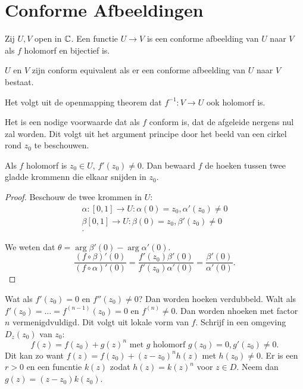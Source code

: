 
\chapter{Conforme Afbeeldingen} \label{chap:conforme_afbeeldingen}

\begin{definitie}
Zij $U, V$ open in $\mathbb{C}$. 
	Een functie $U\to V$ is een conforme afbeelding van  $U$ naar $V$ als $f$ holomorf en bijectief is. 

	$U$ en $V$ zijn conform equivalent als er een conforme afbeelding van $U$ naar $V $ bestaat. 
\end{definitie}

\begin{opmerking}
	Het volgt uit de openmapping theorem dat $f^{-1}:V \to U$ ook holomorf is.
\end{opmerking}

Het is een nodige voorwaarde dat als $f$ conform is, dat de afgeleide nergens nul zal worden. 
Dit volgt uit het argument principe door het beeld van een cirkel rond $z_0$ te beschouwen.  

\begin{propositie}
	Als $f$ holomorf is $z_0 \in U$, $f'(z_0) \ne 0$. Dan bewaard $f$ de hoeken tussen twee gladde krommenn die elkaar snijden in $z_0$. 
\end{propositie}
\begin{proof}
	Beschouw de twee krommen in $U$:  
	\begin{align*}
		\alpha: [0,1] \to U: \alpha(0) = z_0, \alpha'(z_0) \ne 0\\
		\beta[0,1] \to U: \beta(0) = z_0, \beta'(z_0) \ne 0\\
	.\end{align*}

	We weten dat $\theta = \arg \beta'(0) - \arg \alpha'(0)$. 
	\[
		\frac{(f\circ \beta)'\left( 0 \right) }{(f \circ \alpha)'(0)} = \frac{f'(z_0)\beta'(0)}{f'(z_0) \alpha'(0)} = \frac{\beta'(0)}{\alpha'(0)}
	.\]  
\end{proof}

Wat als $f'(z_0) = 0$ en $f''(z_0) \ne 0$? Dan worden hoeken verdubbeld. 
Walt als $f'(z_0) = \ldots = f^{(n-1)}(z_0) = 0$ en $f^{(n)} \ne 0$. Dan worden nhoeken met factor $n$ vermenigdvuldigd. 
Dit volgt uit lokale vorm van $f$. Schrijf  in een omgeving $D_z(z_0)$ van $z_0$: \[
	f(z) = f(z_0) + g(z)^{n} \text{ met } g \text{ holomorf } g(z_0) = 0, g'(z_0) \ne 0  
.\]
Dit kan zo want 
$f(z) = f(z_0) + (z-z_0)^{n}h(z)$ met $h(z_0) \ne 0 $. 
Er is een $r > 0$ en een funcntie $k(z)$ zodat $h(z) = k(z)^{n}$ voor $z \in D$. Neem dan $g(z) = (z - z_0)k(z_0)$. 

